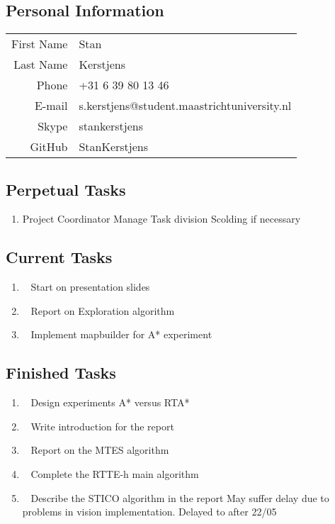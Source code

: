 \subsection{Personal Information}
\begin{table}[h!]
	\begin{tabular}{rl}
	First Name 	& Stan\\
	Last Name	& Kerstjens\\
	Phone		& +31 6 39 80 13 46\\
	E-mail		& s.kerstjens@student.maastrichtuniversity.nl\\
	Skype		& stankerstjens\\
	GitHub		& StanKerstjens
\end{tabular}
\end{table}

\subsection{Perpetual Tasks}
\begin{enumerate}
	\item Project Coordinator
		\subitem Manage Task division
		\subitem Scolding if necessary
\end{enumerate}

\subsection{Current Tasks}
\begin{enumerate}
	
	\item~
		Start on presentation slides
	\item~
		Report on Exploration algorithm
	\item~
		Implement mapbuilder for A* experiment
\end{enumerate}

\subsection{Finished Tasks}
\begin{enumerate}
	\item~
		Design experiments
		\subitem A* versus RTA*
	\item~\marginpar {}
		Write introduction for the report
	\item~
		Report on the MTES algorithm
	\item~
		Complete the RTTE-h main algorithm
	\item~
	Describe the STICO algorithm in the report
		\subitem May suffer delay due to problems in vision implementation.
		\subitem Delayed to after 22/05
\end{enumerate}